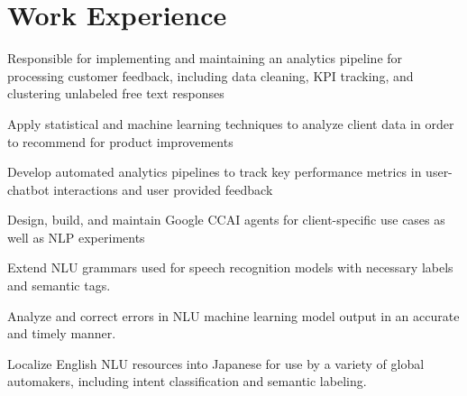 \documentclass[letterpaper]{deedy-resume_sm} %
\begin{document}

\lastupdated %


\section{Work Experience}
\begin{tightitemize}
\item Responsible for implementing and maintaining an analytics pipeline for processing customer feedback, including data cleaning, KPI tracking, and clustering unlabeled free text responses
\item Apply statistical and machine learning techniques to analyze client data in order to recommend for product improvements
\item Develop automated analytics pipelines to track key performance metrics in user-chatbot interactions and user provided feedback
\item Design, build, and maintain Google CCAI agents for client-specific use cases as well as NLP experiments
\end{tightitemize}
\begin{tightitemize}
\item Extend NLU grammars used for speech recognition models with necessary labels and semantic tags.
\item Analyze and correct errors in NLU machine learning model output in an accurate and timely manner.
\item Localize English NLU resources into Japanese for use by a variety of global automakers, including intent classification and semantic labeling.   
\end{tightitemize}
\end{document}

